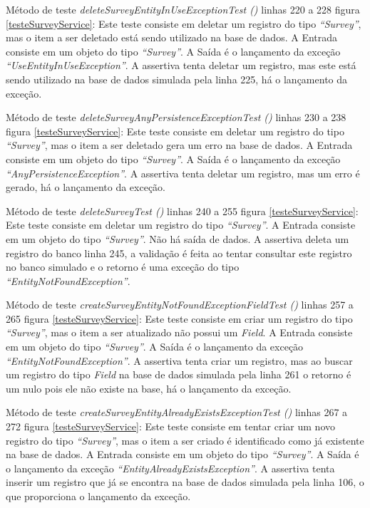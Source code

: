 Método de teste \textit{ deleteSurveyEntityInUseExceptionTest ()} linhas 220 a 228 figura \ref{testeSurveyService}: Este teste consiste em deletar um registro do tipo \textit{“Survey”}, mas o item a ser deletado está sendo utilizado na base de dados. A Entrada consiste em um objeto do tipo \textit{“Survey”}. A Saída é o lançamento da exceção \textit{“UseEntityInUseException”}. A assertiva tenta deletar um registro, mas este está sendo utilizado na base de dados simulada pela linha 225, há o lançamento da exceção.  

Método de teste \textit{ deleteSurveyAnyPersistenceExceptionTest ()} linhas 230 a 238 figura \ref{testeSurveyService}: Este teste consiste em deletar um registro do tipo \textit{“Survey”}, mas o item a ser deletado gera um erro na base de dados. A Entrada consiste em um objeto do tipo \textit{“Survey”}. A Saída é o lançamento da exceção \textit{“AnyPersistenceException”}. A assertiva tenta deletar um registro, mas um erro é gerado, há o lançamento da exceção.

Método de teste \textit{ deleteSurveyTest ()} linhas 240 a 255 figura \ref{testeSurveyService}: Este teste consiste em deletar um registro do tipo \textit{“Survey”}. A Entrada consiste em um objeto do tipo \textit{“Survey”}. Não há saída de dados.  A assertiva deleta um registro do banco linha 245, a validação é feita ao tentar consultar este registro no banco simulado e o retorno é uma exceção do tipo \textit{“EntityNotFoundException”}.  

Método de teste \textit{ createSurveyEntityNotFoundExceptionFieldTest ()} linhas 257 a 265 figura \ref{testeSurveyService}: Este teste consiste em criar um registro do tipo \textit{“Survey”}, mas o item a ser atualizado não possui um \textit{Field}. A Entrada consiste em um objeto do tipo \textit{“Survey”}. A Saída é o lançamento da exceção \textit{“EntityNotFoundException”}. A assertiva tenta criar um registro, mas ao buscar um registro do tipo \textit{Field} na base de dados simulada pela linha 261 o retorno é um nulo pois ele não existe na base, há o lançamento da exceção.  

Método de teste \textit{ createSurveyEntityAlreadyExistsExceptionTest ()} linhas 267 a 272 figura \ref{testeSurveyService}: Este teste consiste em tentar criar um novo registro do tipo \textit{“Survey”}, mas o item a ser criado é identificado como já existente na base de dados. A Entrada consiste em um objeto do tipo \textit{“Survey”}. A Saída é o lançamento da exceção \textit{“EntityAlreadyExistsException”}. A assertiva tenta inserir um registro que já se encontra na base de dados simulada pela linha 106, o que proporciona o lançamento da exceção.  

